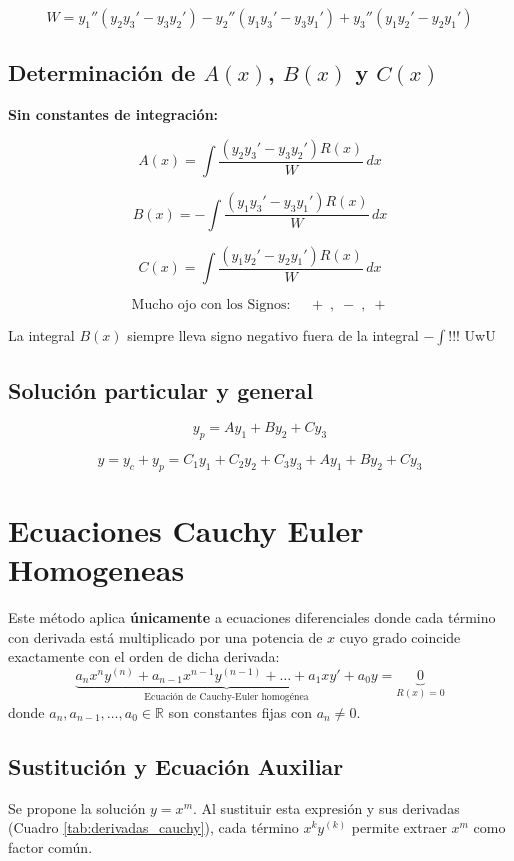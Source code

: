 \documentclass[10pt,letterpaper]{article}
\begin{document}
	\[
	W=
	y_1''(y_2y_3'-y_3y_2')
	-y_2''(y_1y_3'-y_3y_1')
	+y_3''(y_1y_2'-y_2y_1')
	\]
	
	\subsection*{Determinación de $A(x)$, $B(x)$ y $C(x)$}
	\textbf{Sin constantes de integración:}
	
	\[
	A(x)=
	\int
	\frac{(y_2y_3'-y_3y_2')R(x)}{W}\,dx	
	\]
	
	\[
	B(x)=
	-\int
	\frac{(y_1y_3'-y_3y_1')R(x)}{W}\,dx
	\]
	
	\[
	C(x)=
	\int
	\frac{(y_1y_2'-y_2y_1')R(x)}{W}\,dx
	\]
	
	\[
	\boxed{\text{Mucho ojo con los Signos: }\quad +\;,\;-\;,\;+}
	\]
	
	La integral $B(x)$ siempre lleva signo negativo fuera de la integral $- \int$!!! UwU
	
	\subsection*{Solución particular y general}
	
	\[
	y_p=Ay_1+By_2+Cy_3
	\]
	
	\[
		y=y_c+y_p
		=C_1y_1+C_2y_2+C_3y_3+Ay_1+By_2+Cy_3
	\]
	
	\newpage
	
	\section*{Ecuaciones Cauchy Euler Homogeneas}
	Este método aplica \textbf{únicamente} a ecuaciones diferenciales donde cada término con derivada está multiplicado por una potencia de $x$ cuyo grado coincide exactamente con el orden de dicha derivada:
	\[
	\underbrace{a_n x^n y^{(n)} + a_{n-1} x^{n-1} y^{(n-1)} + \dots + a_1 x y' + a_0 y}_{\text{Ecuación de Cauchy-Euler homogénea}} = \underbrace{0}_{R(x) = 0}
	\]
	donde $a_n, a_{n-1}, \dots, a_0 \in \mathbb{R}$ son constantes fijas con $a_n \neq 0$.
	
	\subsection*{Sustitución y Ecuación Auxiliar}
	
	Se propone la solución $y = x^m$. Al sustituir esta expresión y sus derivadas (Cuadro \ref{tab:derivadas_cauchy}), cada término $x^k y^{(k)}$ permite extraer $x^m$ como factor común. 
	
\end{document}

